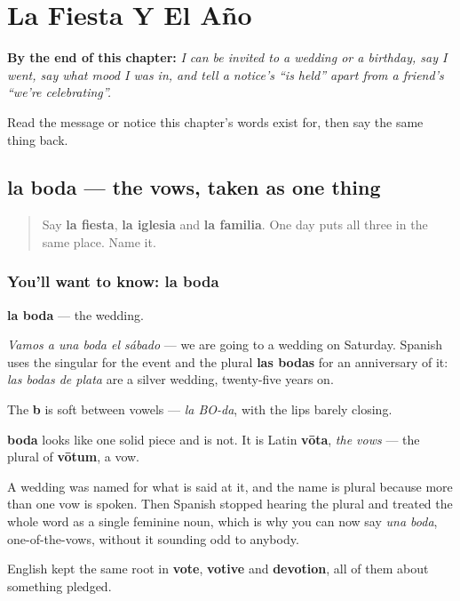 
\chapter{La Fiesta Y El Año}
\label{ch:es-fiesta}

\begin{chapteropening}
\textbf{By the end of this chapter:} \emph{I can be invited to a wedding or a birthday, say I went, say what mood I was in, and tell a notice's \textquotedblleft{}is held\textquotedblright{} apart from a friend's \textquotedblleft{}we're celebrating\textquotedblright{}.}

Read the message or notice this chapter's words exist for, then say the same thing back.
\end{chapteropening}

\section[la boda]{la boda — the vows, taken as one thing}

\label{lesson:ES-C440-boda}



\begin{quote}
Say \textbf{la fiesta}, \textbf{la iglesia} and \textbf{la familia}. One day puts all three in the same place. Name it.
\end{quote}

\subsection*{You'll want to know: la boda}
\textbf{la boda} — the wedding.

\emph{Vamos a una boda el sábado} — we are going to a wedding on Saturday. Spanish uses the singular for the event and the plural \textbf{las bodas} for an anniversary of it: \emph{las bodas de plata} are a silver wedding, twenty-five years on.

The \textbf{b} is soft between vowels — \emph{la BO-da}, with the lips barely closing.

\begin{cousinweb}
\textbf{boda} looks like one solid piece and is not. It is Latin \textbf{vōta}, \emph{the vows} — the plural of \textbf{vōtum}, a vow.

A wedding was named for what is said at it, and the name is plural because more than one vow is spoken. Then Spanish stopped hearing the plural and treated the whole word as a single feminine noun, which is why you can now say \emph{una boda}, one-of-the-vows, without it sounding odd to anybody.

English kept the same root in \textbf{vote}, \textbf{votive} and \textbf{devotion}, all of them about something pledged.
\end{cousinweb}

